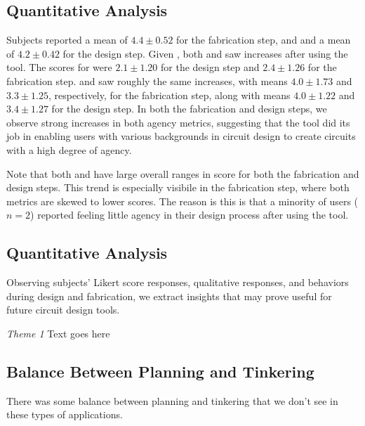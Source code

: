 \documentclass{sigchi}
\begin{document}

\subsection{Quantitative Analysis}
  Subjects reported a mean  of $ 4.4 \pm 0.52$ for the fabrication step, and and a mean of $4.2 \pm 0.42$ for the design step.
  Given , both  and  saw increases after using the tool.
  The scores for  were $2.1 \pm 1.20$ for the design step and $2.4 \pm 1.26$ for the fabrication step.  and 
  saw roughly the same increases, with means $4.0 \pm 1.73$ and $3.3 \pm 1.25$, respectively, for the fabrication step, along with
  means $4.0 \pm 1.22$ and $3.4 \pm 1.27$ for the design step. In both the fabrication and design steps, we observe strong increases in both agency
  metrics, suggesting that the tool did its job in enabling users with various backgrounds in circuit design to create circuits with a high
  degree of agency.

  Note that both  and  have large overall ranges in score for both the fabrication and
  design steps. This trend is especially visibile in the fabrication step, where both  metrics are skewed to lower scores.
  The reason is this is that a minority of users ($n = 2$)  reported feeling little agency in their design process after using the tool.

\subsection{Quantitative Analysis}
  Observing subjects' Likert score responses, qualitative responses, and behaviors during design and fabrication, we extract insights
  that may prove useful for future circuit design tools.

  \textit{Theme 1}
  Text goes here

\subsection{Balance Between Planning and Tinkering}
  There was some balance between planning and tinkering that we don't see in these types of applications.
\end{document}
